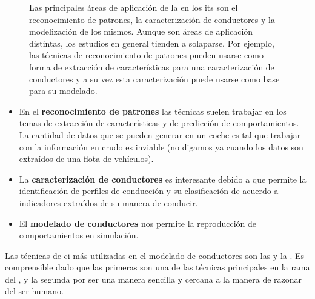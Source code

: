 \begin{figure}[t]
	\centering
	\caption[Principales areas de aplicación de la \acrshort{ci} en los \acrshort{its}]{Las principales áreas de aplicación de la  en los \Acrshort{its} son el reconocimiento de patrones, la caracterización de conductores y la modelización de los mismos. Aunque son áreas de aplicación distintas, los estudios en general tienden a solaparse. Por ejemplo, las técnicas de reconocimiento de patrones pueden usarse como forma de extracción de características para una caracterización de conductores y a su vez esta caracterización puede usarse como base para su modelado.}
	\label{fig:main-applications-of-ci-in-its}
\end{figure}

\begin{itemize}
	\item En el \textbf{reconocimiento de patrones} las técnicas suelen trabajar en los temas de extracción de características y de predicción de comportamientos. La cantidad de datos que se pueden generar en un coche es tal que trabajar con la información en crudo es inviable (no digamos ya cuando los datos son extraídos de una flota de vehículos).
	\item La \textbf{caracterización de conductores} es interesante debido a que permite la identificación de perfiles de conducción y su clasificación de acuerdo a indicadores extraídos de su manera de conducir.
	\item El \textbf{modelado de conductores} nos permite la reproducción de comportamientos en simulación.
\end{itemize}

Las técnicas de \gls{ci} más utilizadas en el modelado de conductores son las  y la . Es comprensible dado que las primeras son una de las técnicas principales en la rama del , y la segunda por ser una manera sencilla y cercana a la manera de razonar del ser humano.

